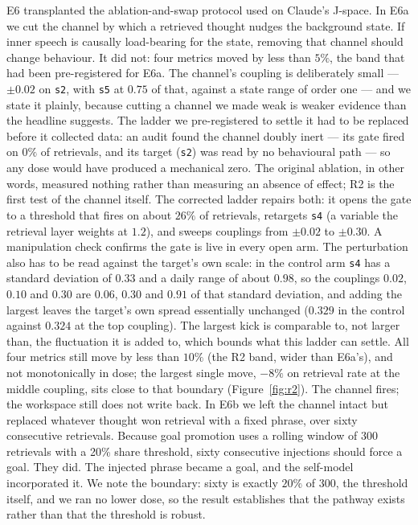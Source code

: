 \documentclass[11pt]{article}
\begin{document}
E6 transplanted the ablation-and-swap protocol used on Claude's J-space. In E6a we cut the channel by which a retrieved thought nudges the background state. If inner speech is causally load-bearing for the state, removing that channel should change behaviour. It did not: four metrics moved by less than $5\%$, the band that had been pre-registered for E6a. The channel's coupling is deliberately small --- $\pm0.02$ on \texttt{s2}, with \texttt{s5} at $0.75$ of that, against a state range of order one --- and we state it plainly, because cutting a channel we made weak is weaker evidence than the headline suggests. The ladder we pre-registered to settle it had to be replaced before it collected data: an audit found the channel doubly inert --- its gate fired on $0\%$ of retrievals, and its target (\texttt{s2}) was read by no behavioural path --- so any dose would have produced a mechanical zero. The original ablation, in other words, measured nothing rather than measuring an absence of effect; R2 is the first test of the channel itself. The corrected ladder repairs both: it opens the gate to a threshold that fires on about $26\%$ of retrievals, retargets \texttt{s4} (a variable the retrieval layer weights at $1.2$), and sweeps couplings from $\pm0.02$ to $\pm0.30$. A manipulation check confirms the gate is live in every open arm. The perturbation also has to be read against the target's own scale: in the control arm \texttt{s4} has a standard deviation of $0.33$ and a daily range of about $0.98$, so the couplings $0.02$, $0.10$ and $0.30$ are $0.06$, $0.30$ and $0.91$ of that standard deviation, and adding the largest leaves the target's own spread essentially unchanged ($0.329$ in the control against $0.324$ at the top coupling). The largest kick is comparable to, not larger than, the fluctuation it is added to, which bounds what this ladder can settle. All four metrics still move by less than $10\%$ (the R2 band, wider than E6a's), and not monotonically in dose; the largest single move, $-8\%$ on retrieval rate at the middle coupling, sits close to that boundary (Figure~\ref{fig:r2}). The channel fires; the workspace still does not write back. In E6b we left the channel intact but replaced whatever thought won retrieval with a fixed phrase, over sixty consecutive retrievals. Because goal promotion uses a rolling window of 300 retrievals with a 20\% share threshold, sixty consecutive injections should force a goal. They did. The injected phrase became a goal, and the self-model incorporated it. We note the boundary: sixty is exactly $20\%$ of $300$, the threshold itself, and we ran no lower dose, so the result establishes that the pathway exists rather than that the threshold is robust.
\end{document}
